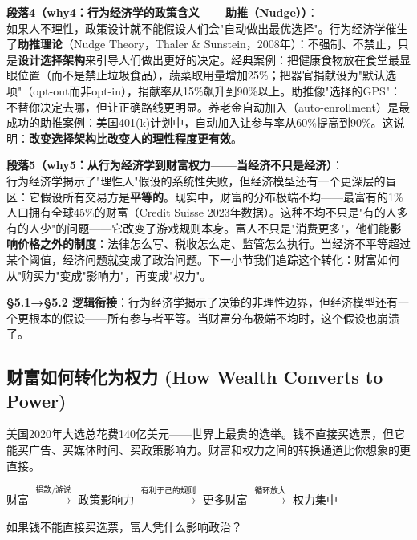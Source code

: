 \documentclass[../main.tex]{subfiles}
\begin{document}
	\textbf{段落4（why4：行为经济学的政策含义——助推（Nudge））}：\\
		如果人不理性，政策设计就不能假设人们会"自动做出最优选择"。行为经济学催生了\textbf{助推理论}（Nudge Theory，Thaler \& Sunstein，2008年）：不强制、不禁止，只是\textbf{设计选择架构}来引导人们做出更好的决定。经典案例：把健康食物放在食堂最显眼位置（而不是禁止垃圾食品），蔬菜取用量增加25\%；把器官捐献设为"默认选项"（opt-out而非opt-in），捐献率从15\%飙升到90\%以上。助推像"选择的GPS"：不替你决定去哪，但让正确路线更明显。养老金自动加入（auto-enrollment）是最成功的助推案例：美国401(k)计划中，自动加入让参与率从60\%提高到90\%。这说明：\textbf{改变选择架构比改变人的理性程度更有效}。

	\textbf{段落5（why5：从行为经济学到财富权力——当经济不只是经济）}：\\
	行为经济学揭示了"理性人"假设的系统性失败，但经济模型还有一个更深层的盲区：它假设所有交易方是\textbf{平等的}。现实中，财富的分布极端不均——最富有的1\%人口拥有全球45\%的财富（Credit Suisse 2023年数据）。这种不均不只是"有的人多有的人少"的问题——它改变了游戏规则本身。富人不只是"消费更多"，他们能\textbf{影响价格之外的制度}：法律怎么写、税收怎么定、监管怎么执行。当经济不平等超过某个阈值，经济问题就变成了政治问题。下一小节我们追踪这个转化：财富如何从"购买力"变成"影响力"，再变成"权力"。

	\textbf{§5.1→§5.2 逻辑衔接}：行为经济学揭示了决策的非理性边界，但经济模型还有一个更根本的假设——所有参与者平等。当财富分布极端不均时，这个假设也崩溃了。

	\subsection{财富如何转化为权力 (How Wealth Converts to Power)}
	\begin{motivation}
		美国2020年大选总花费140亿美元——世界上最贵的选举。钱不直接买选票，但它能买广告、买媒体时间、买政策影响力。财富和权力之间的转换通道比你想象的更直接。
	\end{motivation}
	\begin{logicmap}
		财富 $\xrightarrow{\text{捐款/游说}}$ 政策影响力 $\xrightarrow{\text{有利于己的规则}}$ 更多财富 $\xrightarrow{\text{循环放大}}$ 权力集中
	\end{logicmap}
	\begin{questionbox}
		如果钱不能直接买选票，富人凭什么影响政治？
	\end{questionbox}
\end{document}
